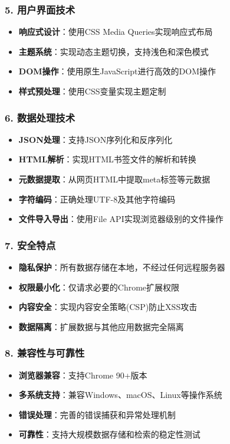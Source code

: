\documentclass[10pt,a4paper]{article}
\begin{document}
\subsubsection*{5. 用户界面技术}
\begin{itemize}
  \item \textbf{响应式设计}：使用CSS Media Queries实现响应式布局
  \item \textbf{主题系统}：实现动态主题切换，支持浅色和深色模式
  \item \textbf{DOM操作}：使用原生JavaScript进行高效的DOM操作
  \item \textbf{样式预处理}：使用CSS变量实现主题定制
\end{itemize}

\subsubsection*{6. 数据处理技术}
\begin{itemize}
  \item \textbf{JSON处理}：支持JSON序列化和反序列化
  \item \textbf{HTML解析}：实现HTML书签文件的解析和转换
  \item \textbf{元数据提取}：从网页HTML中提取meta标签等元数据
  \item \textbf{字符编码}：正确处理UTF-8及其他字符编码
  \item \textbf{文件导入导出}：使用File API实现浏览器级别的文件操作
\end{itemize}

\subsubsection*{7. 安全特点}
\begin{itemize}
  \item \textbf{隐私保护}：所有数据存储在本地，不经过任何远程服务器
  \item \textbf{权限最小化}：仅请求必要的Chrome扩展权限
  \item \textbf{内容安全}：实现内容安全策略(CSP)防止XSS攻击
  \item \textbf{数据隔离}：扩展数据与其他应用数据完全隔离
\end{itemize}

\subsubsection*{8. 兼容性与可靠性}
\begin{itemize}
  \item \textbf{浏览器兼容}：支持Chrome 90+版本
  \item \textbf{多系统支持}：兼容Windows、macOS、Linux等操作系统
  \item \textbf{错误处理}：完善的错误捕获和异常处理机制
  \item \textbf{可靠性}：支持大规模数据存储和检索的稳定性测试
\end{itemize}
\end{document}
